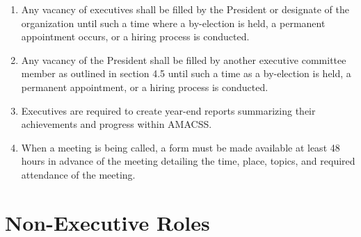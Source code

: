 \documentclass[12pt,a4paper]{article}
\begin{document}
\begin{enumerate}
\item Any vacancy of executives shall be filled by the President or designate of the organization until such a time where a by-election is held, a permanent appointment occurs, or a hiring process is conducted.

\item Any vacancy of the President shall be filled by another executive committee member as outlined in section 4.5 until such a time as a by-election is held, a permanent appointment, or a hiring process is conducted.

\item Executives are required to create year-end reports summarizing their achievements and progress within AMACSS.

\item When a meeting is being called, a form must be made available at least 48 hours in advance of the meeting detailing the time, place, topics, and required attendance of the meeting.
\end{enumerate}

\section{Non-Executive Roles}
\end{document}
